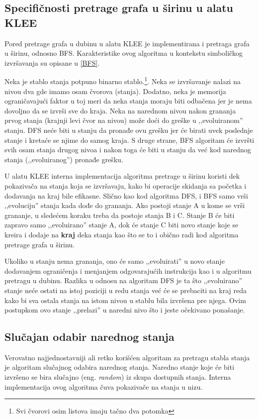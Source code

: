 \documentclass[12pt,oneside]{memoir}
\begin{document}
\subsection{Specifičnosti pretrage grafa u širinu u alatu KLEE} 
Pored pretrage grafa u dubinu u alatu KLEE je implementirana i pretraga grafa u širinu, odnosno BFS. Karakteristike ovog algoritma u kontekstu simboličkog izvršavanja su opisane u \ref{BFS}.

Neka je stablo stanja potpuno binarno stablo.\footnote[3]{Svi čvorovi osim listova imaju tačno dva potomka}. Neka se izvršavanje nalazi na nivou dva gde imamo osam čvorova (stanja). Dodatno, neka je memorija ograničavajući faktor u toj meri da neka stanja moraju biti odbačena jer je nema dovoljno da se izvrši sve do kraja. Neka na narednom nivou nakon grananja prvog stanja (krajnji levi čvor na nivou) može doći do greške u ,,evoluiranom'' stanju. DFS neće biti u stanju da pronađe ovu grešku jer će birati uvek poslednje stanje i kretaće se njime do samog kraja. S druge strane, BFS algoritam će izvršti svih osam stanja drugog nivoa i nakon toga će biti u stanju da već kod narednog stanja (,,evoluiranog'') pronađe grešku. 

U alatu KLEE interna implementacija algoritma pretrage u širinu koristi dek pokazivača na stanja koja se izvršavaju, kako bi operacije skidanja sa početka i dodavanja na kraj bile efikasne. Slično kao kod algoritma DFS, i BFS samo vrši ,,evoluciju'' stanja kada dođe do grananja. Ako postoji stanje A u kome se vrši grananje, u sledećem koraku treba da postoje stanja B i C. Stanje B će biti zapravo samo ,,evoluirano'' stanje A, dok će stanje C biti novo stanje koje se kreira i dodaje na \textbf{kraj} deka stanja kao što se to i obično radi kod algoritma pretrage grafa u širinu. 

Ukoliko u stanju nema grananja, ono će samo ,,evoluirati'' u novo stanje dodavanjem ograničenja i menjanjem odgovarajućih instrukcija kao i u algoritmu pretragu u dubinu. Razlika u odnosu na algoritam DFS je ta što ,,evoluirano'' stanje neće ostati na istoj poziciji u redu stanja već će se prebaciti na kraj reda kako bi sva ostala stanja na istom nivou u stablu bila izvršena pre njega. Ovim postupkom ovo stanje ,,prelazi'' u naredni nivo što i jeste očekivano ponašanje. 

\subsection{Slučajan odabir narednog stanja} 
Verovatno najjednostavniji ali retko korišćen algoritam za pretragu stabla stanja je algoritam slučajnog odabira narednog stanja. Naredno stanje koje će biti izvršeno se bira slučajno (eng. \textit{random}) iz skupa dostupnih stanja. Interna implementacija ovog algoritma čuva pokazivače na stanja u nizu. 
\end{document}
